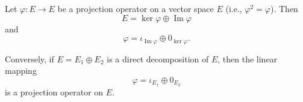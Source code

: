 Let $\varphi: E \to E$ be a projection operator on a vector space $E$ (i.e., $\varphi^2 = \varphi$). Then
$$E = \ker \varphi \oplus \operatorname{Im} \varphi$$
and
$$\varphi = \iota_{\operatorname{Im} \varphi} \oplus 0_{\ker \varphi}.$$

Conversely, if $E = E_1 \oplus E_2$ is a direct decomposition of $E$, then the linear mapping
$$\varphi = \iota_{E_1} \oplus 0_{E_2}$$
is a projection operator on $E$.
